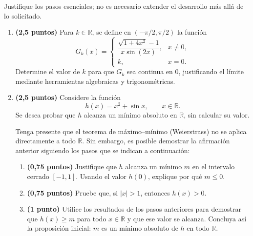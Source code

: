 \documentclass[10pt,a5paper]{article}
\begin{document}
\smallskip
\noindent Justifique los pasos esenciales; no es necesario extender el desarrollo más allá de lo solicitado.
\begin{enumerate}[resume]
  \item \textbf{(2,5 puntos)} Para $k\in\mathbb{R}$, se define en $(-\pi/2,\pi/2)$ la función
  \[
    G_k(x)=\begin{cases}
      \dfrac{\sqrt{1+4x^2}-1}{x\sin(2x)},&x\neq0,\\[2mm]
      k,&x=0.
    \end{cases}
  \]
  Determine el valor de $k$ para que $G_k$ sea continua en $0$, justificando el límite mediante herramientas algebraicas y trigonométricas.

  \item \textbf{(2,5 puntos)} Considere la función
  \[
    h(x)=x^2+\sin x,\qquad x\in\mathbb{R}.
  \]
  Se desea probar que $h$ alcanza un mínimo absoluto en $\mathbb{R}$, sin calcular su valor.
  
  Tenga presente que el teorema de máximo--mínimo (Weierstrass) no se aplica directamente a todo $\mathbb{R}$. Sin embargo, es posible demostrar la afirmación anterior siguiendo los pasos que se indican a continuación:
  \begin{enumerate}
    \item \textbf{(0,75 puntos)} Justifique que $h$ alcanza un mínimo $m$ en el intervalo cerrado $[-1,1]$. Usando el valor $h(0)$, explique por qué $m\leq0$.
    \item \textbf{(0,75 puntos)} Pruebe que, si $|x|>1$, entonces $h(x)>0$.
    \item \textbf{(1 punto)} Utilice los resultados de los pasos anteriores para demostrar que $h(x)\geq m$ para todo $x\in\mathbb{R}$ y que ese valor se alcanza. Concluya así la proposición inicial: $m$ es un mínimo absoluto de $h$ en todo $\mathbb{R}$.
  \end{enumerate}
\end{enumerate}
\end{document}
